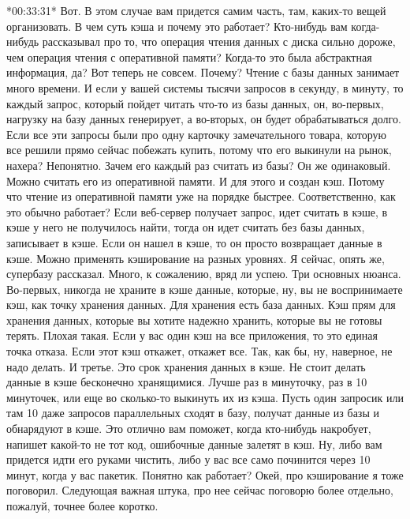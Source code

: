 \documentclass[12pt]{article} %
\begin{document}
*00:33:31*
Вот. В этом случае вам придется самим часть, там, каких-то вещей организовать.  В чем суть кэша и почему это работает?  Кто-нибудь вам когда-нибудь рассказывал про то, что операция чтения данных с диска сильно дороже, чем операция чтения с оперативной памяти?  Когда-то это была абстрактная информация, да?  Вот теперь не совсем. Почему?  Чтение с базы данных занимает много времени.  И если у вашей системы тысячи запросов в секунду, в минуту, то каждый запрос, который пойдет читать что-то из базы данных, он, во-первых, нагрузку на базу данных генерирует, а во-вторых, он будет обрабатываться долго.  Если все эти запросы были про одну карточку замечательного товара, которую все решили прямо сейчас побежать купить, потому что его выкинули на рынок, нахера? Непонятно.  Зачем его каждый раз считать из базы?  Он же одинаковый.  Можно считать его из оперативной памяти.  И для этого и создан кэш.  Потому что чтение из оперативной памяти уже на порядке быстрее.  Соответственно, как это обычно работает?  Если веб-сервер получает запрос, идет считать в кэше, в кэше у него не получилось найти, тогда он идет считать без базы данных, записывает в кэше.  Если он нашел в кэше, то он просто возвращает данные в кэше.  Можно применять кэширование на разных уровнях.  Я сейчас, опять же, супербазу рассказал.  Много, к сожалению, вряд ли успею.  Три основных нюанса.  Во-первых, никогда не храните в кэше данные, которые, ну, вы не воспринимаете кэш, как точку хранения данных.  Для хранения есть база данных.  Кэш прям для хранения данных, которые вы хотите надежно хранить, которые вы не готовы терять.  Плохая такая.  Если у вас один кэш на все приложения, то это единая точка отказа.  Если этот кэш откажет, откажет все.  Так, как бы, ну, наверное, не надо делать.  И третье. Это срок хранения данных в кэше.  Не стоит делать данные в кэше бесконечно хранящимися.  Лучше раз в минуточку, раз в 10 минуточек, или еще во сколько-то выкинуть их из кэша.  Пусть один запросик или там 10 даже запросов параллельных сходят в базу, получат данные из базы и обнарядуют в кэше.  Это отлично вам поможет, когда кто-нибудь накробует, напишет какой-то не тот код, ошибочные данные залетят в кэш.  Ну, либо вам придется идти его руками чистить, либо у вас все само починится через 10 минут, когда у вас пакетик.  Понятно как работает?  Окей, про кэширование я тоже поговорил.  Следующая важная штука, про нее сейчас поговорю более отдельно, пожалуй, точнее более коротко.
\end{document}
